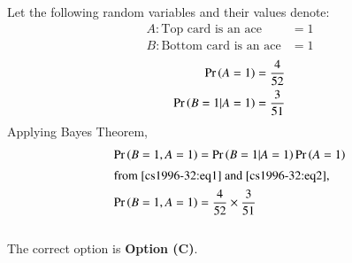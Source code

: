 
Let the following random variables and their values denote:
\begin{align*}
    A : \text{Top card is an ace} &= 1\\
    B : \text{Bottom card is an ace} &=1
\end{align*}
\begin{align}
    \pr{A=1} &= \frac{4}{52} \label{cs1996-32:eq1} \\
    \pr{B = 1|A = 1} &= \frac{3}{51} \label{cs1996-32:eq2}
\end{align}
Applying Bayes Theorem, 
\begin{align}
    \Pr\left(B = 1, A = 1\right) &= \Pr\left(B = 1|A = 1\right) \Pr\left(A = 1\right)\\
\intertext{from \eqref{cs1996-32:eq1} and \eqref{cs1996-32:eq2},}
    \Pr\left(B = 1, A = 1\right) &=   \frac{4}{52} \times\frac{3}{51}
\end{align}
\\The correct option is \textbf{Option (C)}.
